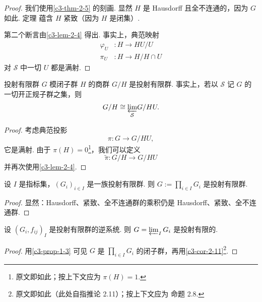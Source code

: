 \begin{proof}
我们使用\autoref{c3-thm-2-5} 的刻画. 显然 $H$ 是 Hausdorff 且全不连通的，因为 $G$ 如此. 定理 \cite[Theorem~26.2, Chapter~3]{mun75} 蕴含 $H$ 紧致（因为 $H$ 是闭集）.

第二个断言由\autoref{c3-lem-2-4} 得出. 事实上，典范映射
\[
\begin{aligned}
\varphi_U&:H\to HU/U\\
\pi_U&:H\to H/H\cap U
\end{aligned}
\]
对 $\mathcal{S}$ 中一切 $U$ 都是满射.
\end{proof}

\begin{proposition}\label{c3-prop-2-9}
投射有限群 $G$ 模闭子群 $H$ 的商群 $G/H$ 是投射有限群. 事实上，若以 $\mathcal{S}$ 记 $G$ 的一切开正规子群之集，则
\[
G/H\cong{\varprojlim_{\mathcal{S}}}G/HU.
\]
\end{proposition}

\begin{proof}
考虑典范投影
\[
\pi:G\to G/HU,
\]
它是满射. 由于 $\pi(H)=0$\footnote{原文即如此；按上下文应为 $\pi(H)=1$.}，我们可以定义
\[
\widetilde{\pi}:G/H\to G/HU
\]
并再次使用\autoref{c3-lem-2-4}.
\end{proof}

\begin{proposition}\label{c3-prop-2-10}
设 $I$ 是指标集，$(G_i)_{i\in I}$ 是一族投射有限群. 则 $G:=\prod_{i\in I}G_i$ 是投射有限群.
\end{proposition}

\begin{proof}
显然：Hausdorff、紧致、全不连通群的乘积仍是 Hausdorff、紧致、全不连通群.
\end{proof}

\begin{corollary}\label{c3-cor-2-11}
设 $(G_i,f_{ij})_I$ 是投射有限群的逆系统. 则 $G=\varprojlim_I G_i$ 是投射有限的.
\end{corollary}

\begin{proof}
用\autoref{c3-prop-1-3} 可见 $G$ 是 $\prod_{i\in I}G_i$ 的闭子群，再用\autoref{c3-cor-2-11}\footnote{原文即如此（此处自指推论 2.11）；按上下文应为 命题 2.8.}.
\end{proof}

